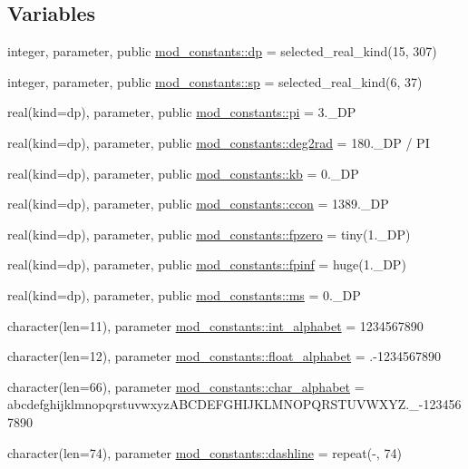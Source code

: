 \subsection*{Variables}
\begin{DoxyCompactItemize}
\item 
integer, parameter, public \hyperlink{namespacemod__constants_ac7aeda7f1802c4ef2a4780773c028214}{mod\+\_\+constants\+::dp} = selected\+\_\+real\+\_\+kind(15, 307)
\item 
integer, parameter, public \hyperlink{namespacemod__constants_af0d7aefb6fb852492ee0db77744a412d}{mod\+\_\+constants\+::sp} = selected\+\_\+real\+\_\+kind(6, 37)
\item 
real(kind=dp), parameter, public \hyperlink{namespacemod__constants_a04c6845722711f5522458ed34969cdc3}{mod\+\_\+constants\+::pi} = 3.\+\_\+\+DP
\item 
real(kind=dp), parameter, public \hyperlink{namespacemod__constants_a505a7c2ab1e1b2fa75db18a1d3e133b4}{mod\+\_\+constants\+::deg2rad} = 180.\+\_\+\+D\+P / PI
\item 
real(kind=dp), parameter, public \hyperlink{namespacemod__constants_af84a9ff68ff16d57560ea196b8e560d4}{mod\+\_\+constants\+::kb} = 0.\+\_\+\+DP
\item 
real(kind=dp), parameter, public \hyperlink{namespacemod__constants_a0943b8c8fb52658fb3d4370e5defb34b}{mod\+\_\+constants\+::ccon} = 1389.\+\_\+\+DP
\item 
real(kind=dp), parameter, public \hyperlink{namespacemod__constants_a1f06c759fc8a61d66f343865300c37d1}{mod\+\_\+constants\+::fpzero} = tiny(1.\+\_\+\+D\+P)
\item 
real(kind=dp), parameter, public \hyperlink{namespacemod__constants_a64820d61363b4adcee8f4f810662e836}{mod\+\_\+constants\+::fpinf} = huge(1.\+\_\+\+D\+P)
\item 
real(kind=dp), parameter, public \hyperlink{namespacemod__constants_ab31d074fb8a49a9991d7d6e3d4904d59}{mod\+\_\+constants\+::ms} = 0.\+\_\+\+DP
\item 
character(len=11), parameter \hyperlink{namespacemod__constants_a41cb897f7d31e58ab3c2b2f7ecf86983}{mod\+\_\+constants\+::int\+\_\+alphabet} = \textquotesingle{}1234567890\textquotesingle{}
\item 
character(len=12), parameter \hyperlink{namespacemod__constants_a4b168363a34adf3e1236769aa1ec0fed}{mod\+\_\+constants\+::float\+\_\+alphabet} = \textquotesingle{}.-\/1234567890\textquotesingle{}
\item 
character(len=66), parameter \hyperlink{namespacemod__constants_a1d9e53f57f87f727d4dd13f1dd4b8e45}{mod\+\_\+constants\+::char\+\_\+alphabet} = \textquotesingle{}abcdefghijklmnopqrstuvwxyz\+A\+B\+C\+D\+E\+F\+G\+H\+I\+J\+K\+L\+M\+N\+O\+P\+Q\+R\+S\+T\+U\+V\+W\+X\+Y\+Z.\+\_\+-\/1234567890 \textquotesingle{}
\item 
character(len=74), parameter \hyperlink{namespacemod__constants_ab55dac3c52ff6b1034697c6e83ac76d8}{mod\+\_\+constants\+::dashline} = repeat(\textquotesingle{}-\/\textquotesingle{}, 74)
\end{DoxyCompactItemize}
